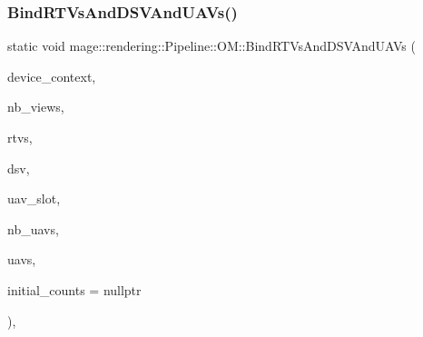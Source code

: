 \mbox{\label{structmage_1_1rendering_1_1_pipeline_1_1_o_m_a7dc275c2961fa64bf20af9d24962ff8f}} 
\subsubsection{\texorpdfstring{Bind\+R\+T\+Vs\+And\+D\+S\+V\+And\+U\+A\+Vs()}{BindRTVsAndDSVAndUAVs()}}
{\footnotesize\ttfamily static void mage\+::rendering\+::\+Pipeline\+::\+O\+M\+::\+Bind\+R\+T\+Vs\+And\+D\+S\+V\+And\+U\+A\+Vs (\begin{DoxyParamCaption}\item[{I\+D3\+D11\+Device\+Context \&}]{device\+\_\+context,  }\item[{\mbox{\hyperlink{namespacemage_aa5d6eaabaac3cdd01873d6a3d27e90f3}{U32}}}]{nb\+\_\+views,  }\item[{I\+D3\+D11\+Render\+Target\+View $\ast$const $\ast$}]{rtvs,  }\item[{I\+D3\+D11\+Depth\+Stencil\+View $\ast$}]{dsv,  }\item[{\mbox{\hyperlink{namespacemage_aa5d6eaabaac3cdd01873d6a3d27e90f3}{U32}}}]{uav\+\_\+slot,  }\item[{\mbox{\hyperlink{namespacemage_aa5d6eaabaac3cdd01873d6a3d27e90f3}{U32}}}]{nb\+\_\+uavs,  }\item[{I\+D3\+D11\+Unordered\+Access\+View $\ast$const $\ast$}]{uavs,  }\item[{const \mbox{\hyperlink{namespacemage_aa5d6eaabaac3cdd01873d6a3d27e90f3}{U32}} $\ast$}]{initial\+\_\+counts = {\ttfamily nullptr} }\end{DoxyParamCaption})\hspace{0.3cm}{\ttfamily [static]}, {\ttfamily [noexcept]}}

\mbox{\label{structmage_1_1rendering_1_1_pipeline_1_1_o_m_a61d92a091182b3fbfb574588a1a5ffb7}} 

